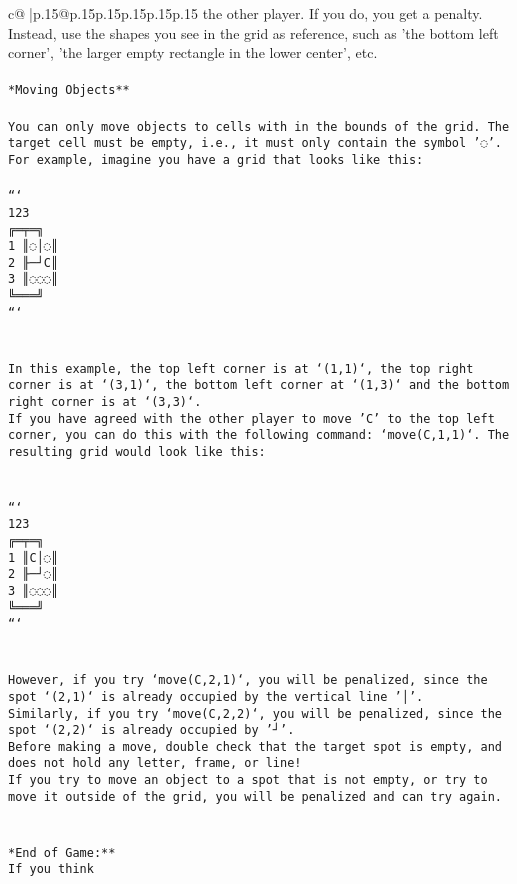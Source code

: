 \documentclass{article}
\begin{document}
{\begin{supertabular}{c@{$\;$}|p{.15\linewidth}@{}p{.15\linewidth}p{.15\linewidth}p{.15\linewidth}p{.15\linewidth}p{.15\linewidth}}
{{{the other player. If you do, you get a penalty. Instead, use the shapes you see in the grid as reference, such as 'the bottom left corner', 'the larger empty rectangle in the lower center', etc.\\ \tt \\ \tt **Moving Objects**\\ \tt \\ \tt * You can only move objects to cells with in the bounds of the grid. The target cell must be empty, i.e., it must only contain the symbol '◌'.\\ \tt * For example, imagine you have a grid that looks like this: \\ \tt \\ \tt ```\\ \tt     123\\ \tt    ╔═╤═╗\\ \tt  1 ║◌│◌║\\ \tt  2 ╟─┘C║\\ \tt  3 ║◌◌◌║\\ \tt    ╚═══╝\\ \tt ```\\ \tt \\ \tt \\ \tt * In this example, the top left corner is at `(1,1)`, the top right corner is at `(3,1)`, the bottom left corner at `(1,3)` and the bottom right corner is at `(3,3)`.\\ \tt * If you have agreed with the other player to move 'C' to the top left corner, you can do this with the following command: `move(C,1,1)`. The resulting grid would look like this: \\ \tt \\ \tt \\ \tt ```\\ \tt     123\\ \tt    ╔═╤═╗\\ \tt  1 ║C│◌║\\ \tt  2 ╟─┘◌║\\ \tt  3 ║◌◌◌║\\ \tt    ╚═══╝\\ \tt ```\\ \tt \\ \tt \\ \tt * However, if you try `move(C,2,1)`, you will be penalized, since the spot `(2,1)` is already occupied by the vertical line '│'.\\ \tt * Similarly, if you try `move(C,2,2)`, you will be penalized, since the spot `(2,2)` is already occupied by '┘'.\\ \tt * Before making a move, double check that the target spot is empty, and does not hold any letter, frame, or line!\\ \tt * If you try to move an object to a spot that is not empty, or try to move it outside of the grid, you will be penalized and can try again.\\ \tt \\ \tt \\ \tt **End of Game:**\\ \tt If you think }}}
\end{supertabular}}
\end{document}
